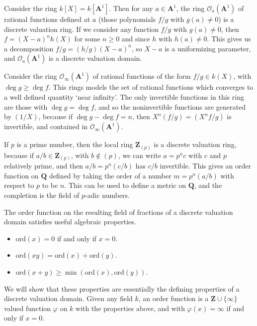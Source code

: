 \begin{example}
    Consider the ring $k[X] = k[\mathbf{A}^1]$. Then for any $a \in \mathbf{A}^1$, the ring $\mathcal{O}_a(\mathbf{A}^1)$ of rational functions defined at $a$ (those polynomials $f/g$ with $g(a) \neq 0$) is a discrete valuation ring. If we consider any function $f/g$ with $g(a) \neq 0$, then $f = (X-a)^nh(X)$ for some $n \geq 0$ and since $h$ with $h(a) \neq 0$. This gives us a decomposition $f/g = (h/g)(X-a)^n$, so $X - a$ is a uniformizing parameter, and $\mathcal{O}_a(\mathbf{A}^1)$ is a discrete valuation domain.
\end{example}

\begin{example}
    Consider the ring $\mathcal{O}_\infty(\mathbf{A}^1)$ of rational functions of the form $f/g \in k(X)$, with $\deg g \geq \deg f$. This rings models the set of rational functions which converges to a well defined quantity `near infinity'. The only invertible functions in this ring are those with $\deg g = \deg f$, and so the noninvertible functions are generated by $(1/X)$, because if $\deg g - \deg f = n$, then $X^n (f/g) = (X^nf/g)$ is invertible, and contained in $\mathcal{O}_\infty(\mathbf{A}^1)$.
\end{example}

\begin{example}
    If $p$ is a prime number, then the local ring $\mathbf{Z}_{(p)}$ is a discrete valuation ring, because if $a/b \in \mathbf{Z}_{(p)}$, with $b \not \in (p)$, we can write $a = p^nc$ with $c$ and $p$ relatively prime, and then $a/b = p^n (c/b)$ has $c/b$ invertible. This gives an order function on $\mathbf{Q}$ defined by taking the order of a number $m = p^n(a/b)$ with respect to $p$ to be $n$. This can be used to define a metric on $\mathbf{Q}$, and the completion is the field of $p$-adic numbers.
\end{example}

The order function on the resulting field of fractions of a discrete valuation domain satisfies useful algebraic properties.
%
\begin{itemize}
    \item $\text{ord}(x) = 0$ if and only if $x = 0$.
    \item $\text{ord}(xy) = \text{ord}(x) + \text{ord}(y)$.
    \item $\text{ord}(x + y) \geq \min(\text{ord}(x), \text{ord}(y))$.
\end{itemize}
%
We will show that these properties are essentially the defining properties of a discrete valuation domain. Given any field $k$, an order function is a $\mathbf{Z} \cup \{ \infty \}$ valued function $\varphi$ on $k$ with the properties above, and with $\varphi(x) = \infty$ if and only if $x = 0$.

